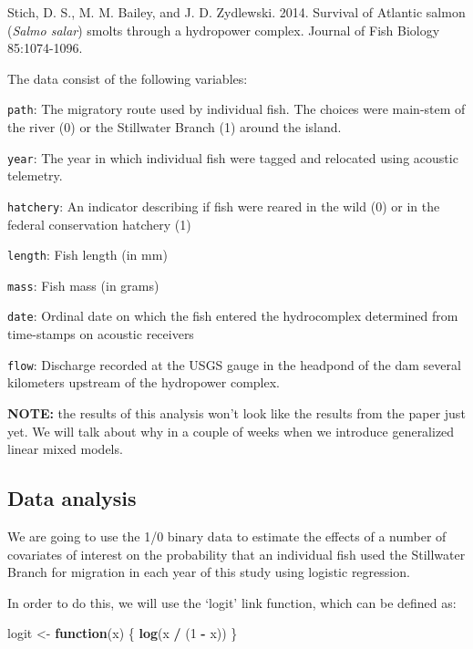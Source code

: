\documentclass[
]{book}
\newenvironment{Shaded}{\begin{snugshade}}{\end{snugshade}}
\newcommand{\ControlFlowTok}[1]{\textcolor[rgb]{0.13,0.29,0.53}{\textbf{#1}}}
\newcommand{\DecValTok}[1]{\textcolor[rgb]{0.00,0.00,0.81}{#1}}
\newcommand{\KeywordTok}[1]{\textcolor[rgb]{0.13,0.29,0.53}{\textbf{#1}}}
\newcommand{\NormalTok}[1]{#1}
\newcommand{\OperatorTok}[1]{\textcolor[rgb]{0.81,0.36,0.00}{\textbf{#1}}}
\newcommand{\StringTok}[1]{\textcolor[rgb]{0.31,0.60,0.02}{#1}}
\begin{document}
Stich, D. S., M. M. Bailey, and J. D. Zydlewski. 2014. Survival of Atlantic salmon (\emph{Salmo salar}) smolts through a hydropower complex. Journal of Fish Biology 85:1074-1096.

The data consist of the following variables:

\texttt{path}: The migratory route used by individual fish. The choices were main-stem of the river (0) or the Stillwater Branch (1) around the island.

\texttt{year}: The year in which individual fish were tagged and relocated using acoustic telemetry.

\texttt{hatchery}: An indicator describing if fish were reared in the wild (0) or in the federal conservation hatchery (1)

\texttt{length}: Fish length (in mm)

\texttt{mass}: Fish mass (in grams)

\texttt{date}: Ordinal date on which the fish entered the hydrocomplex determined from time-stamps on acoustic receivers

\texttt{flow}: Discharge recorded at the USGS gauge in the headpond of the dam several kilometers upstream of the hydropower complex.

\textbf{NOTE:} the results of this analysis won't look like the results from the paper just yet. We will talk about why in a couple of weeks when we introduce generalized linear mixed models.

\hypertarget{data-analysis}{%
\subsection{Data analysis}\label{data-analysis}}

We are going to use the 1/0 binary data to estimate the effects of a number of covariates of interest on the probability that an individual fish used the Stillwater Branch for migration in each year of this study using logistic regression.

In order to do this, we will use the `logit' link function, which can be defined as:

\begin{Shaded}
\begin{Highlighting}[]
\NormalTok{logit <-}\StringTok{ }\ControlFlowTok{function}\NormalTok{(x) \{}
  \KeywordTok{log}\NormalTok{(x }\OperatorTok{/}\StringTok{ }\NormalTok{(}\DecValTok{1} \OperatorTok{-}\StringTok{ }\NormalTok{x))}
\NormalTok{\}}
\end{Highlighting}
\end{Shaded}
\end{document}
